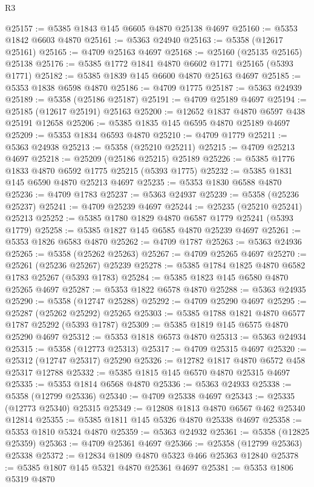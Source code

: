 \begin{lexlean}{R3}
\begin{coremodule}
@25157 := @5385 @1843 @145 @6605 @4870 @25138 @4697
@25160 := @5353 @1842 @6603 @4870
@25161 := @5363 @24940
@25163 := @5358 (@12617 @25161)
@25165 := @4709 @25163 @4697
@25168 := @25160 (@25135 @25165) @25138
@25176 := @5385 @1772 @1841 @4870 @6602 @1771 @25165 (@5393 @1771)
@25182 := @5385 @1839 @145 @6600 @4870 @25163 @4697
@25185 := @5353 @1838 @6598 @4870
@25186 := @4709 @1775
@25187 := @5363 @24939
@25189 := @5358 (@25186 @25187)
@25191 := @4709 @25189 @4697
@25194 := @25185 (@12617 @25191) @25163
@25200 := @12652 @1837 @4870 @6597 @438 @25191 @12658
@25206 := @5385 @1835 @145 @6595 @4870 @25189 @4697
@25209 := @5353 @1834 @6593 @4870
@25210 := @4709 @1779
@25211 := @5363 @24938
@25213 := @5358 (@25210 @25211)
@25215 := @4709 @25213 @4697
@25218 := @25209 (@25186 @25215) @25189
@25226 := @5385 @1776 @1833 @4870 @6592 @1775 @25215 (@5393 @1775)
@25232 := @5385 @1831 @145 @6590 @4870 @25213 @4697
@25235 := @5353 @1830 @6588 @4870
@25236 := @4709 @1783
@25237 := @5363 @24937
@25239 := @5358 (@25236 @25237)
@25241 := @4709 @25239 @4697
@25244 := @25235 (@25210 @25241) @25213
@25252 := @5385 @1780 @1829 @4870 @6587 @1779 @25241 (@5393 @1779)
@25258 := @5385 @1827 @145 @6585 @4870 @25239 @4697
@25261 := @5353 @1826 @6583 @4870
@25262 := @4709 @1787
@25263 := @5363 @24936
@25265 := @5358 (@25262 @25263)
@25267 := @4709 @25265 @4697
@25270 := @25261 (@25236 @25267) @25239
@25278 := @5385 @1784 @1825 @4870 @6582 @1783 @25267 (@5393 @1783)
@25284 := @5385 @1823 @145 @6580 @4870 @25265 @4697
@25287 := @5353 @1822 @6578 @4870
@25288 := @5363 @24935
@25290 := @5358 (@12747 @25288)
@25292 := @4709 @25290 @4697
@25295 := @25287 (@25262 @25292) @25265
@25303 := @5385 @1788 @1821 @4870 @6577 @1787 @25292 (@5393 @1787)
@25309 := @5385 @1819 @145 @6575 @4870 @25290 @4697
@25312 := @5353 @1818 @6573 @4870
@25313 := @5363 @24934
@25315 := @5358 (@12773 @25313)
@25317 := @4709 @25315 @4697
@25320 := @25312 (@12747 @25317) @25290
@25326 := @12782 @1817 @4870 @6572 @458 @25317 @12788
@25332 := @5385 @1815 @145 @6570 @4870 @25315 @4697
@25335 := @5353 @1814 @6568 @4870
@25336 := @5363 @24933
@25338 := @5358 (@12799 @25336)
@25340 := @4709 @25338 @4697
@25343 := @25335 (@12773 @25340) @25315
@25349 := @12808 @1813 @4870 @6567 @462 @25340 @12814
@25355 := @5385 @1811 @145 @5326 @4870 @25338 @4697
@25358 := @5353 @1810 @5324 @4870
@25359 := @5363 @24932
@25361 := @5358 (@12825 @25359)
@25363 := @4709 @25361 @4697
@25366 := @25358 (@12799 @25363) @25338
@25372 := @12834 @1809 @4870 @5323 @466 @25363 @12840
@25378 := @5385 @1807 @145 @5321 @4870 @25361 @4697
@25381 := @5353 @1806 @5319 @4870

\end{coremodule}
\end{lexlean}
